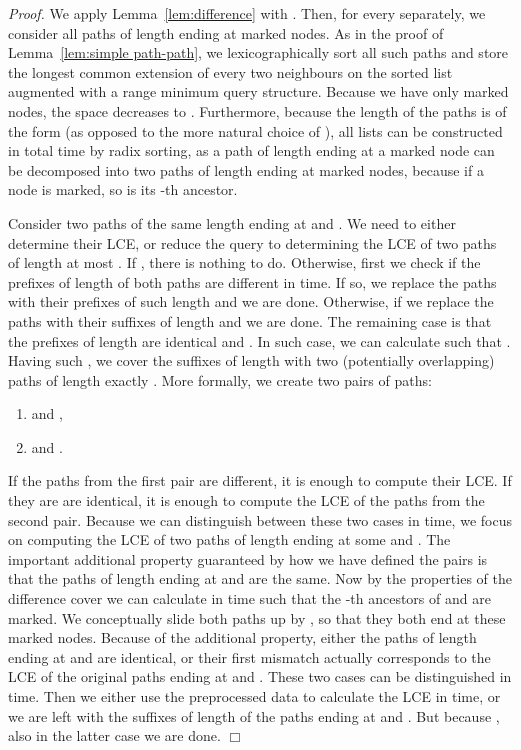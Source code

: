 \documentclass [10pt]{article}
\newcommand{\qed}{\hfill\ensuremath{\Box}\medskip\\\noindent}
\newenvironment{proof}{\noindent\emph{Proof. }}{}
\begin{document}
\begin{proof}
We apply Lemma~\ref{lem:difference} with . Then, for every  separately, we consider all paths of length
 ending at marked nodes. As in the proof of Lemma~\ref{lem:simple path-path}, we lexicographically sort all such paths
and store the longest common extension of every two neighbours on the sorted list augmented with a range minimum query structure. Because
we have only  marked nodes, the space decreases to . Furthermore, because the length of the paths is of the form
 (as opposed to the more natural choice of ), all lists can be constructed in  total time by radix sorting, as
a path of length  ending at a marked node can be decomposed into two paths of length  ending
at marked nodes, because if a node is marked, so is its -th ancestor.

Consider two paths of the same length  ending at  and . We need to either determine their
LCE, or reduce the query to determining the LCE of two paths of length at most .
If , there is nothing to do.
Otherwise, first we check if the prefixes of length  of both paths are different in  time. If so, we replace the paths
with their prefixes of such length and we are done. Otherwise, if  we replace the paths with their suffixes of length
 and we are done. The remaining case is that the prefixes of length
 are identical and . In such case, we can calculate  such that
. Having such , we cover the suffixes of length  with two
(potentially overlapping) paths of length exactly . More formally, we create two pairs of paths:
\begin{enumerate}
\item  and ,
\item  and .
\end{enumerate}
If the paths from the first pair are different, it is enough to compute their LCE. If they are are identical, it is enough to
compute the LCE of the paths from the second pair. Because we can distinguish between these two cases in  time,
we focus on computing the LCE of two paths of length  ending at some  and .
The important additional property guaranteed by how we have defined the pairs is that the paths of length  ending at
 and  are the same. Now by the properties of the difference cover
we can calculate in  time  such that the -th ancestors of  and  are marked. We conceptually slide both paths up
by , so that they both end at these marked nodes. Because of the additional property, either the paths of length  ending at
 and  are identical, or their first mismatch actually corresponds to the LCE
of the original paths ending at  and . These two cases can be distinguished in  time. Then we either use the preprocessed data
to calculate the LCE in  time, or we are left with the suffixes of length  of the paths ending at  and .
But because , also in the latter case we are done.
\qed
\end{proof}
\end{document}
